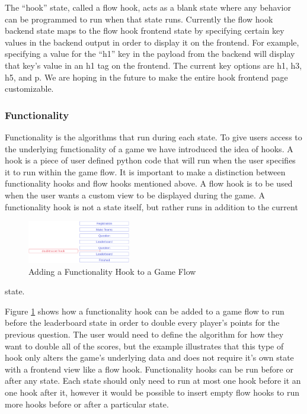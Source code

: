 \documentclass{article}
\begin{document}
            The ``hook'' state, called a flow hook, acts as a blank state where any behavior can be programmed to run when that state runs. Currently the flow hook backend state maps to the flow hook frontend state by specifying certain key values in the backend output in order to display it on the frontend. For example, specifying a value for the ``h1'' key in the payload from the backend will display that key's value in an h1 tag on the frontend. The current key options are h1, h3, h5, and p. We are hoping in the future to make the entire hook frontend page customizable.
        
        \subsubsection{Functionality}\label{functionality}
            Functionality is the algorithms that run during each state. To give users access to the underlying functionality of a game we have introduced the idea of hooks. A hook is a piece of user defined python code that will run when the user specifies it to run within the game flow. It is important to make a distinction between functionality hooks and flow hooks mentioned above. A flow hook is to be used when the user wants a custom view to be displayed during the game. A functionality hook is not a state itself, but rather runs in addition to the current
            \begin{figure}
                \centering
                \includegraphics[width=0.40\textwidth]{images/architecture-hook.png}
                \caption{Adding a Functionality Hook to a Game Flow}
                \label{fig:functionality-hook}
            \end{figure}
            state.
            
            Figure \ref{fig:functionality-hook} shows how a functionality hook can be added to a game flow to run before the leaderboard state in order to double every player's points for the previous question. The user would need to define the algorithm for how they want to double all of the scores, but the example illustrates that this type of hook only alters the game's underlying data and does not require it's own state with a frontend view like a flow hook. Functionality hooks can be run before or after any state. Each state should only need to run at most one hook before it an one hook after it, however it would be possible to insert empty flow hooks to run more hooks before or after a particular state.
\end{document}

